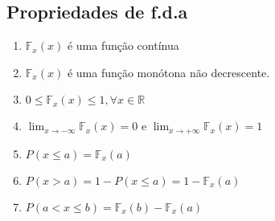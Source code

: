  \subsection{Propriedades de f.d.a}
 \begin{enumerate}[label=(\alph*)]
   \item $\mathbb{F}_{x}(x)$  é uma função contínua
   \item $\mathbb{F}_{x}(x)$ é uma função monótona não decrescente. 
   \item  $0 \le \mathbb{F}_{x}(x)\le 1, \forall x \in \mathbb{R}$
   \item $ \lim_{x \to -\infty} \mathbb{F}_{x}(x)=0$ e $ \lim_{x \to +\infty} \mathbb{F}_{x}(x)=1$
   \item $P(x \le a) = \mathbb{F}_{x}(a)$
   \item $P(x>a)=1 - P(x \le a)= 1 - \mathbb{F}_{x}(a)$
   \item $P(a<x\le b)= \mathbb{F}_{x}(b)- \mathbb{F}_{x}(a)$
 \end{enumerate}

